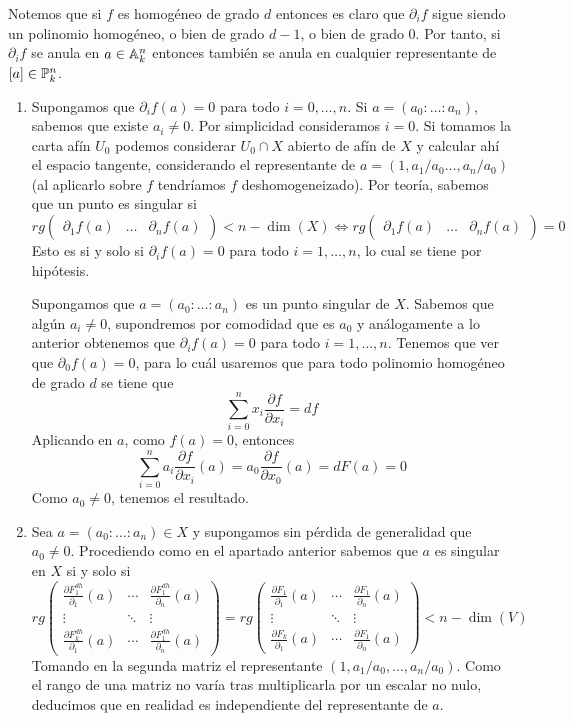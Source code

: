 \documentclass[twoside]{article}
\begin{document}
\begin{solucion}
Notemos que si $f$ es homogéneo de grado $d$ entonces es claro que $\partial_i f$ sigue siendo un polinomio homogéneo, o bien de grado $d-1$, o bien de grado $0$. Por tanto, si $\partial_i f$ se anula en $a\in \mathbb{A}^n_k$ entonces también se anula en cualquier representante de $[a]\in \mathbb{P}^n_k$. 
\begin{enumerate}
\item Supongamos que $\partial_i f(a)=0$ para todo $i=0,\dotsc,n$. Si $a=(a_0:\dotsc:a_n)$, sabemos que existe $a_i \neq 0$. Por simplicidad consideramos $i=0$. Si tomamos la carta afín $U_0$ podemos considerar $U_0 \cap X$ abierto de afín de $X$ y calcular ahí el espacio tangente, considerando el representante de $a=(1,a_1/a_0 \dotsc, a_n/a_0)$ (al aplicarlo sobre $f$ tendríamos $f$ deshomogeneizado). Por teoría, sabemos que un punto es singular si 
$$
rg
\begin{pmatrix}
\partial_1 f(a) & \dotsc & \partial_n f(a)
\end{pmatrix} < n-\dim(X) \Leftrightarrow 
rg
\begin{pmatrix}
\partial_1 f(a) & \dotsc & \partial_n f(a)
\end{pmatrix} = 0
$$
Esto es si y solo si $\partial_i f(a) = 0$ para todo $i=1,\dotsc,n$, lo cual se tiene por hipótesis.

Supongamos que $a=(a_0:\dotsc:a_n)$ es un punto singular de $X$. Sabemos que algún $a_i\neq 0$, supondremos por comodidad que es $a_0$ y análogamente a lo anterior obtenemos que $\partial_i f(a) = 0$ para todo $i=1,\dotsc,n$. Tenemos que ver que $\partial_0 f(a)=0$, para lo cuál usaremos que para todo polinomio homogéneo de grado $d$ se tiene que
$$
\sum_{i=0}^n x_i \frac{\partial f}{\partial x_i}=df
$$
Aplicando en $a$, como $f(a)=0$, entonces
$$
\sum_{i=0}^n a_i \frac{\partial f}{\partial x_i}(a) = a_0 \frac{\partial f}{\partial x_0}(a) = d F(a) = 0
$$
Como $a_0\neq 0$, tenemos el resultado.
\item Sea $a=(a_0:\dotsc:a_n)\in X$ y supongamos sin pérdida de generalidad que $a_0\neq 0$. Procediendo como en el apartado anterior sabemos que $a$ es singular en $X$ si y solo si 
$$
rg
\begin{pmatrix}
\frac{\partial F_1^{dh}}{\partial_1}(a) & \cdots & \frac{\partial F_1^{dh}}{\partial_n}(a)\\
\vdots & \ddots& \vdots\\
\frac{\partial F_k^{dh}}{\partial_1}(a) & \cdots & \frac{\partial F_1^{dh}}{\partial_n}(a)
\end{pmatrix} =  rg
\begin{pmatrix}
\frac{\partial F_1}{\partial_1}(a) & \cdots & \frac{\partial F_1}{\partial_n}(a)\\
\vdots & \ddots& \vdots\\
\frac{\partial F_k}{\partial_1}(a) & \cdots & \frac{\partial F_1}{\partial_n}(a)
\end{pmatrix} < n-\dim(V)
$$
Tomando en la segunda matriz el representante $(1,a_1/a_0,\dotsc,a_n/a_0)$. Como el rango de una matriz no varía tras multiplicarla por un escalar no nulo, deducimos que en realidad es independiente del representante de $a$. 


\end{enumerate}
\end{solucion}
\end{document}
